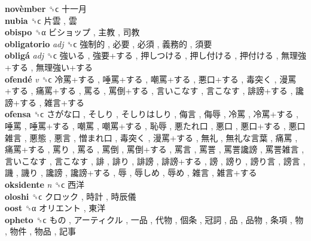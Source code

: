 \textbf{novèmber} ␝ϲ   十一月   \\
\textbf{nubia} ␝ϲ   片雲 ,  雲   \\
\textbf{obispo} ␝α   ビショップ ,  主教 ,  司教   \\
\textbf{obligatorio} \emph{adj}  ␝ϲ   強制的 ,  必要 ,  必須 ,  義務的 ,  須要   \\
\textbf{obligá} \emph{adj}  ␝ϲ   強いる ,  強要+する ,  押しつける ,  押し付ける ,  押付ける ,  無理強+する ,  無理強い+する   \\
\textbf{ofendé} \emph{v}  ␝ϲ   冷罵+する ,  唾罵+する ,  嘲罵+する ,  悪口+する ,  毒突く ,  漫罵+する ,  痛罵+する ,  罵る ,  罵倒+する ,  言いこなす ,  言こなす ,  誹謗+する ,  讒謗+する ,  雑言+する   \\
\textbf{ofensa} ␝ϲ   さがな口 ,  そしり ,  そしりはしり ,  侮言 ,  侮辱 ,  冷罵 ,  冷罵+する ,  唾罵 ,  唾罵+する ,  嘲罵 ,  嘲罵+する ,  恥辱 ,  悪たれ口 ,  悪口 ,  悪口+する ,  悪口雑言 ,  悪態 ,  悪言 ,  憎まれ口 ,  毒突く ,  漫罵+する ,  無礼 ,  無礼な言葉 ,  痛罵 ,  痛罵+する ,  罵り ,  罵る ,  罵倒 ,  罵倒+する ,  罵言 ,  罵詈 ,  罵詈讒謗 ,  罵詈雑言 ,  言いこなす ,  言こなす ,  誹 ,  誹り ,  誹謗 ,  誹謗+する ,  謗 ,  謗り ,  謗り言 ,  謗言 ,  譏 ,  譏り ,  讒謗 ,  讒謗+する ,  辱 ,  辱しめ ,  辱め ,  雑言 ,  雑言+する   \\
\textbf{oksidente} \emph{n}  ␝ϲ   西洋   \\
\textbf{oloshi} ␝ϲ   クロック ,  時計 ,  時辰儀   \\
\textbf{oost} ␝α   オリエント ,  東洋   \\
\textbf{opheto} ␝ϲ   もの ,  アーティクル ,  一品 ,  代物 ,  個条 ,  冠詞 ,  品 ,  品物 ,  条項 ,  物 ,  物件 ,  物品 ,  記事   \\
